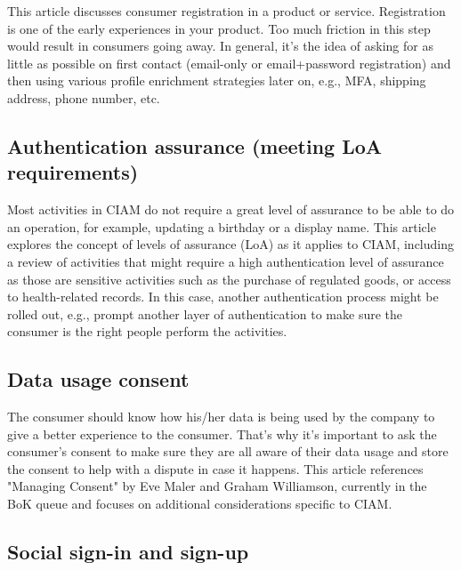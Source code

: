 This article discusses consumer registration in a product or service.
Registration is one of the early experiences in your product. Too much
friction in this step would result in consumers going away. In general,
it's the idea of asking for as little as possible on first contact
(email-only or email+password registration) and then using various
profile enrichment strategies later on, e.g., MFA, shipping address,
phone number, etc.

\hypertarget{authentication-assurance-meeting-loa-requirements}{%
\subsection{Authentication assurance (meeting LoA
requirements)}\label{authentication-assurance-meeting-loa-requirements}}

Most activities in CIAM do not require a great level of assurance to be
able to do an operation, for example, updating a birthday or a display
name. This article explores the concept of levels of assurance (LoA) as
it applies to CIAM, including a review of activities that might require
a high authentication level of assurance as those are sensitive
activities such as the purchase of regulated goods, or access to
health-related records. In this case, another authentication process
might be rolled out, e.g., prompt another layer of authentication to
make sure the consumer is the right people perform the activities.~

\hypertarget{data-usage-consent}{%
\subsection{Data usage consent}\label{data-usage-consent}}

The consumer should know how his/her data is being used by the company
to give a better experience to the consumer. That's why it's important
to ask the consumer's consent to make sure they are all aware of their
data usage and store the consent to help with a dispute in case it
happens. This article references "Managing Consent" by Eve Maler and
Graham Williamson, currently in the BoK queue and focuses on additional
considerations specific to CIAM.

\hypertarget{social-sign-in-and-sign-up}{%
\subsection{Social sign-in and
sign-up}\label{social-sign-in-and-sign-up}}

